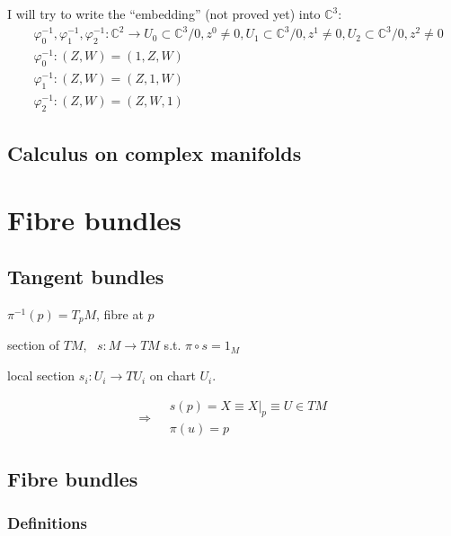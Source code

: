 \documentclass{book}
\begin{document}
I will try to write the ``embedding'' (not proved yet) into $\mathbb{C}^3$:
\[
\begin{aligned}
  & \varphi_0^{-1}, \varphi_1^{-1}, \varphi_2^{-1} : \mathbb{C}^2 \to U_0 \subset \mathbb{C}^3/0, z^0 \neq 0 ,  U_1 \subset \mathbb{C}^3/0, z^1 \neq 0, U_2 \subset \mathbb{C}^3/0, z^2 \neq 0 \\
  & \varphi_0^{-1}:(Z,W) = (1,Z,W) \\ 
  & \varphi_1^{-1}:(Z,W) = (Z,1,W) \\ 
  & \varphi_2^{-1}:(Z,W) = (Z,W,1) 
\end{aligned}
\]





\section{ Calculus on complex manifolds }



\chapter{Fibre bundles}

\section{ Tangent bundles }

$\pi^{-1}(p) = T_p M$, fibre at $p$

section of $TM$, \, $s: M \to TM$ s.t. $\pi \circ s = 1_M$

local section $s_i : U_i \to TU_i$ on chart $U_i$.  

\[
\Longrightarrow \begin{aligned} &  s(p) = X \equiv \left. X \right|_p \equiv U \in TM \\
 & \pi(u) = p \end{aligned}
\]





\section{ Fibre bundles }


\subsection{ Definitions}
\end{document}
